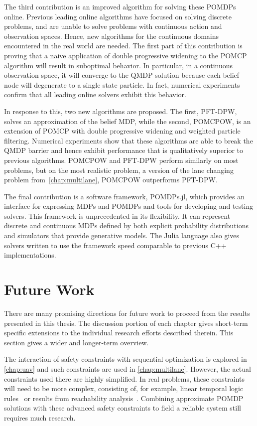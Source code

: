 The third contribution is an improved algorithm for solving these POMDPs online.
Previous leading online algorithms have focused on solving discrete problems, and are unable to solve problems with continuous action and observation spaces.
Hence, new algorithms for the continuous domains encountered in the real world are needed.
The first part of this contribution is proving that a naive application of double progressive widening to the POMCP algorithm will result in suboptimal behavior.
In particular, in a continuous observation space, it will converge to the QMDP solution because each belief node will degenerate to a single state particle.
In fact, numerical experiments confirm that all leading online solvers exhibit this behavior.

In response to this, two new algorithms are proposed.
The first, PFT-DPW, solves an approximation of the belief MDP, while the second, POMCPOW, is an extension of POMCP with double progressive widening and weighted particle filtering.
Numerical experiments show that these algorithms are able to break the QMDP barrier and hence exhibit performance that is qualitatively superior to previous algorithms.
POMCPOW and PFT-DPW perform similarly on most problems, but on the most realistic problem, a version of the lane changing problem from~\cref{chap:multilane}, POMCPOW outperforms PFT-DPW.

The final contribution is a software framework, POMDPs.jl, which provides an interface for expressing MDPs and POMDPs and tools for developing and testing solvers.
This framework is unprecedented in its flexibility.
It can represent discrete and continuous MDPs defined by both explicit probability distributions and simulators that provide generative models.
The Julia language also gives solvers written to use the framework speed comparable to previous C++ implementations.

\section{Future Work}

There are many promising directions for future work to proceed from the results presented in this thesis.
The discussion portion of each chapter gives short-term specific extensions to the individual research efforts described therein.
This section gives a wider and longer-term overview.

The interaction of safety constraints with sequential optimization is explored in \cref{chap:uav} and such constraints are used in \cref{chap:multilane}.
However, the actual constraints used there are highly simplified.
In real problems, these constraints will need to be more complex, consisting of, for example, linear temporal logic rules~\cite{sadigh2016safe} or results from reachability analysis~\cite{chen2015exact}.
Combining approximate POMDP solutions with these advanced safety constraints to field a reliable system still requires much research.

